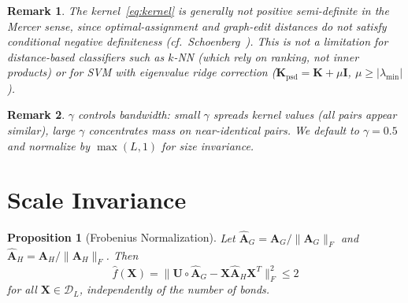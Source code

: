 \documentclass[conference]{IEEEtran}
\newtheorem{proposition}{Proposition}
\newtheorem{remark}{Remark}
\begin{document}
\begin{remark}
The kernel~\eqref{eq:kernel} is generally \emph{not}
positive semi-definite in the Mercer sense,
since optimal-assignment and graph-edit distances do not
satisfy conditional negative definiteness
(cf.\ Schoenberg~\cite{schoenberg1938metric}).
This is not a limitation for distance-based classifiers
such as $k$-NN (which rely on ranking, not inner products)
or for SVM with eigenvalue ridge correction
($\mathbf{K}_{\text{psd}} = \mathbf{K} + \mu\mathbf{I}$,
$\mu \geq |\lambda_{\min}|$).
\end{remark}

\begin{remark}
$\gamma$ controls bandwidth:
small $\gamma$ spreads kernel values (all pairs appear similar),
large $\gamma$ concentrates mass on near-identical pairs.
We default to $\gamma = 0.5$ and normalize by $\max(L,1)$
for size invariance.
\end{remark}


\section{Scale Invariance}
\label{sec:normalization}

\begin{proposition}[Frobenius Normalization]
\label{prop:normalization}
Let $\hat{\mathbf{A}}_G = \mathbf{A}_G / \|\mathbf{A}_G\|_F$
and $\hat{\mathbf{A}}_H = \mathbf{A}_H / \|\mathbf{A}_H\|_F$.
Then
\begin{equation}
\hat{f}(\mathbf{X})
  = \bigl\| \mathbf{U} \circ \hat{\mathbf{A}}_G
    - \mathbf{X}\hat{\mathbf{A}}_H\mathbf{X}^{T} \bigr\|_F^2
  \leq 2
\label{eq:normalized-cost}
\end{equation}
for all $\mathbf{X} \!\in\! \mathcal{D}_L$,
independently of the number of bonds.
\end{proposition}
\end{document}
